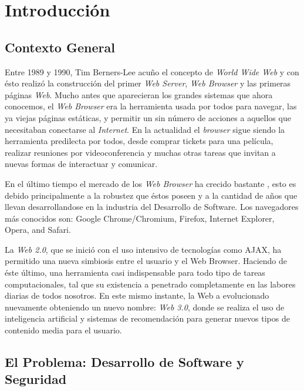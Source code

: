 


\chapter{Introducción}
\label{chap1:intro}

\section{Contexto General}
\label{chap1:CG}

Entre 1989 y 1990, Tim Berners-Lee acuño el concepto de \textit{World Wide Web} y con ésto realizó la construcción del primer \textit{Web Server}, \textit{Web Browser} y las primeras páginas \textit{Web}. Mucho antes que aparecieran los grandes sistemas que ahora conocemos, el \textit{Web Browser} era la herramienta usada por todos para navegar, las ya viejas páginas estáticas, y permitir un sin número de acciones a aquellos que necesitaban conectarse al \textit{Internet}. En la actualidad el \textit{browser} sigue siendo la herramienta predilecta por todos, desde comprar tickets para una película, realizar reuniones por videoconferencia y muchas otras tareas que invitan a nuevas formas de interactuar y comunicar.


En el último tiempo el mercado de los \textit{Web Browser} ha crecido bastante , esto es debido principalmente a la robustez que éstos poseen y a la cantidad de años que llevan desarrollandose en la industria del Desarrollo de Software. Los navegadores más conocidos son: Google Chrome/Chromium, Firefox, Internet Explorer, Opera, and Safari. 

La \textit{Web 2.0}, que se inició con el uso intensivo de tecnologías como AJAX, ha permitido una nueva simbiosis entre el usuario y el Web Browser. Haciendo de éste último, una herramienta casi indispensable para todo tipo de tareas computacionales, tal que su existencia a penetrado completamente en las labores diarias de todos nosotros. En este mismo instante, la Web a evolucionado nuevamente obteniendo un nuevo nombre: \textit{Web 3.0}, donde se realiza el uso de inteligencia artificial y sistemas de recomendación para generar nuevos tipos de contenido media para el usuario.


\section{El Problema: Desarrollo de Software y Seguridad}
\label{chap1:SD_SS}

